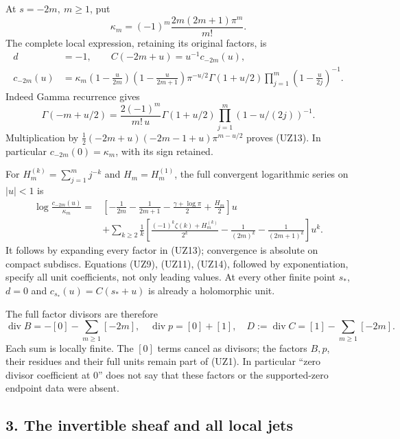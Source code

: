 \documentclass[
  10pt,
  a4paper,
]{article}
\begin{document}
At \(s=-2m,\ m\ge1\), put \[
\kappa_m=(-1)^m\frac{2m(2m+1)\pi^m}{m!}.
\tag{UZ12}
\] The complete local expression, retaining its original factors, is \[
\begin{aligned}
d&=-1,\qquad C(-2m+u)=u^{-1}c_{-2m}(u),\\
c_{-2m}(u)
&=\kappa_m
\left(1-\frac{u}{2m}\right)
\left(1-\frac{u}{2m+1}\right)
\pi^{-u/2}\Gamma(1+u/2)
\prod_{j=1}^{m}\left(1-\frac{u}{2j}\right)^{-1}.
\end{aligned}\tag{UZ13}
\] Indeed Gamma recurrence gives \[
\Gamma(-m+u/2)
=\frac{2(-1)^m}{m!\,u}\Gamma(1+u/2)
\prod_{j=1}^m(1-u/(2j))^{-1}.
\] Multiplication by \(\tfrac12(-2m+u)(-2m-1+u)\pi^{m-u/2}\) proves
(UZ13). In particular \(c_{-2m}(0)=\kappa_m\), with its sign retained.

For \(H_m^{(k)}=\sum_{j=1}^m j^{-k}\) and \(H_m=H_m^{(1)}\), the full
convergent logarithmic series on \(|u|<1\) is \[
\begin{aligned}
\log\frac{c_{-2m}(u)}{\kappa_m}
={}&\left[-\frac1{2m}-\frac1{2m+1}
-\frac{\gamma+\log\pi}{2}+\frac{H_m}{2}\right]u\\
&+\sum_{k\ge2}\frac1k
\left[
\frac{(-1)^k\zeta(k)+H_m^{(k)}}{2^k}
-\frac1{(2m)^k}-\frac1{(2m+1)^k}
\right]u^k .
\end{aligned}\tag{UZ14}
\] It follows by expanding every factor in (UZ13); convergence is
absolute on compact subdiscs. Equations (UZ9), (UZ11), (UZ14), followed
by exponentiation, specify all unit coefficients, not only leading
values. At every other finite point \(s_*\), \(d=0\) and
\(c_{s_*}(u)=C(s_*+u)\) is already a holomorphic unit.

The full factor divisors are therefore \[
\operatorname{div}B=-[0]-\sum_{m\ge1}[-2m],\quad
\operatorname{div}p=[0]+[1],\quad
D:=\operatorname{div}C=[1]-\sum_{m\ge1}[-2m].
\tag{UZ15}
\] Each sum is locally finite. The \([0]\) terms cancel as divisors; the
factors \(B,p\), their residues and their full units remain part of
(UZ1). In particular ``zero divisor coefficient at 0'' does not say that
these factors or the supported-zero endpoint data were absent.

\subsection{3. The invertible sheaf and all local
jets}\label{the-invertible-sheaf-and-all-local-jets}
\end{document}
